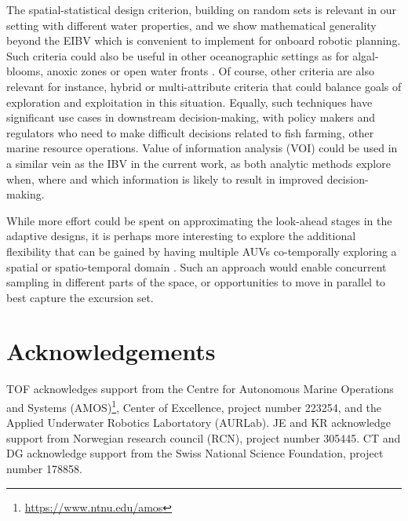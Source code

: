\documentclass[aoas]{imsart}
\begin{document}
The spatial-statistical design criterion, building on random sets is
relevant in our setting with different water properties, and we show
mathematical generality beyond the EIBV which is convenient to
implement for onboard robotic planning. Such criteria could also be
useful in other oceanographic settings as for algal-blooms, anoxic
zones or open water fronts \cite{costa19}. Of course, other criteria
are also relevant for instance, hybrid or multi-attribute criteria
that could balance goals of exploration and exploitation in this
situation. Equally, such techniques have significant use cases in
downstream decision-making, with policy makers and regulators who need
to make difficult decisions related to fish farming, other marine
resource operations. Value of information analysis (VOI)
\citep{Eidsvik:15} could be used in a similar vein as the IBV in the
current work, as both analytic methods explore when, where and which
information is likely to result in improved decision-making.

While more effort could be spent on approximating the look-ahead
stages in the adaptive designs, it is perhaps more interesting to
explore the additional flexibility that can be gained by having
multiple AUVs co-temporally exploring a spatial or spatio-temporal
domain \citep{ferreira2019advancing}. Such an approach would enable
concurrent sampling in different parts of the space, or opportunities
to move in parallel to best capture the excursion set.

\section*{Acknowledgements}

TOF acknowledges support from the Centre for Autonomous Marine
Operations and Systems
(AMOS)\footnote{\url{https://www.ntnu.edu/amos}}, Center of
Excellence, project number 223254, and the Applied Underwater Robotics
Labortatory (AURLab). JE and KR acknowledge support from Norwegian
research council (RCN), project number 305445. CT and DG acknowledge
support from the Swiss National Science Foundation, project number
178858.

\end{document}
